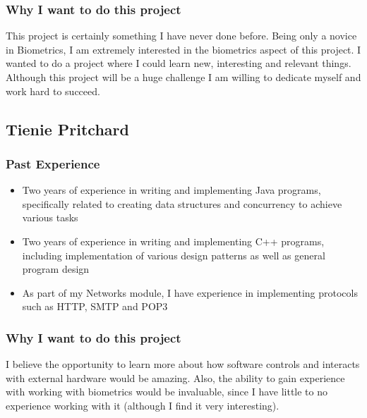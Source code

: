 \subsubsection{Why I want to do this project}
This project is certainly something I have never done before. Being only a novice in Biometrics, I am extremely interested in the biometrics aspect of this project. I wanted to do a project where I could learn new, interesting and relevant things. Although this project will be a huge challenge I am willing to dedicate myself and work hard to succeed. 

\pagebreak
\subsection{Tienie Pritchard}

\subsubsection{Past Experience} 
\begin{itemize}
	\item{Two years of experience in writing and implementing Java programs, specifically related to creating data structures and concurrency to achieve various tasks}
	\item{Two years of experience in writing and implementing C++ programs, including implementation of various design patterns as well as general program design}
	\item{As part of my Networks module, I have experience in implementing protocols such as HTTP, SMTP and POP3}
\end{itemize}
\subsubsection{Why I want to do this project}
I believe the opportunity to learn more about how software controls and interacts with external hardware would be amazing. Also, the ability to gain experience with working with biometrics would be invaluable, since I have little to no experience working with it (although I find it very interesting). 
